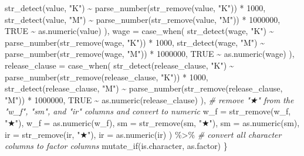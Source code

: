 \documentclass[
]{article}
\newenvironment{Shaded}{\begin{snugshade}}{\end{snugshade}}
\newcommand{\AttributeTok}[1]{\textcolor[rgb]{0.77,0.63,0.00}{#1}}
\newcommand{\CommentTok}[1]{\textcolor[rgb]{0.56,0.35,0.01}{\textit{#1}}}
\newcommand{\ConstantTok}[1]{\textcolor[rgb]{0.00,0.00,0.00}{#1}}
\newcommand{\DecValTok}[1]{\textcolor[rgb]{0.00,0.00,0.81}{#1}}
\newcommand{\FunctionTok}[1]{\textcolor[rgb]{0.00,0.00,0.00}{#1}}
\newcommand{\NormalTok}[1]{#1}
\newcommand{\SpecialCharTok}[1]{\textcolor[rgb]{0.00,0.00,0.00}{#1}}
\newcommand{\StringTok}[1]{\textcolor[rgb]{0.31,0.60,0.02}{#1}}
\begin{document}
\begin{Shaded}
\begin{Highlighting}[]
           \FunctionTok{str\_detect}\NormalTok{(value, }\StringTok{"K"}\NormalTok{) }\SpecialCharTok{\textasciitilde{}} \FunctionTok{parse\_number}\NormalTok{(}\FunctionTok{str\_remove}\NormalTok{(value, }\StringTok{"K"}\NormalTok{)) }\SpecialCharTok{*} \DecValTok{1000}\NormalTok{,}
           \FunctionTok{str\_detect}\NormalTok{(value, }\StringTok{"M"}\NormalTok{) }\SpecialCharTok{\textasciitilde{}} \FunctionTok{parse\_number}\NormalTok{(}\FunctionTok{str\_remove}\NormalTok{(value, }\StringTok{"M"}\NormalTok{)) }\SpecialCharTok{*} \DecValTok{1000000}\NormalTok{,}
           \ConstantTok{TRUE} \SpecialCharTok{\textasciitilde{}} \FunctionTok{as.numeric}\NormalTok{(value)}
\NormalTok{         ),}
         \AttributeTok{wage =} \FunctionTok{case\_when}\NormalTok{(}
           \FunctionTok{str\_detect}\NormalTok{(wage, }\StringTok{"K"}\NormalTok{) }\SpecialCharTok{\textasciitilde{}} \FunctionTok{parse\_number}\NormalTok{(}\FunctionTok{str\_remove}\NormalTok{(wage, }\StringTok{"K"}\NormalTok{)) }\SpecialCharTok{*} \DecValTok{1000}\NormalTok{,}
           \FunctionTok{str\_detect}\NormalTok{(wage, }\StringTok{"M"}\NormalTok{) }\SpecialCharTok{\textasciitilde{}} \FunctionTok{parse\_number}\NormalTok{(}\FunctionTok{str\_remove}\NormalTok{(wage, }\StringTok{"M"}\NormalTok{)) }\SpecialCharTok{*} \DecValTok{1000000}\NormalTok{,}
           \ConstantTok{TRUE} \SpecialCharTok{\textasciitilde{}} \FunctionTok{as.numeric}\NormalTok{(wage)}
\NormalTok{         ),}
         \AttributeTok{release\_clause =} \FunctionTok{case\_when}\NormalTok{(}
           \FunctionTok{str\_detect}\NormalTok{(release\_clause, }\StringTok{"K"}\NormalTok{) }\SpecialCharTok{\textasciitilde{}} \FunctionTok{parse\_number}\NormalTok{(}\FunctionTok{str\_remove}\NormalTok{(release\_clause, }\StringTok{"K"}\NormalTok{)) }\SpecialCharTok{*} \DecValTok{1000}\NormalTok{,}
           \FunctionTok{str\_detect}\NormalTok{(release\_clause, }\StringTok{"M"}\NormalTok{) }\SpecialCharTok{\textasciitilde{}} \FunctionTok{parse\_number}\NormalTok{(}\FunctionTok{str\_remove}\NormalTok{(release\_clause, }\StringTok{"M"}\NormalTok{)) }\SpecialCharTok{*} \DecValTok{1000000}\NormalTok{,}
           \ConstantTok{TRUE} \SpecialCharTok{\textasciitilde{}} \FunctionTok{as.numeric}\NormalTok{(release\_clause)}
\NormalTok{         ),}
         \CommentTok{\# remove "★" from the "w\_f", "sm", and "ir" columns and convert to numeric}
         \AttributeTok{w\_f =} \FunctionTok{str\_remove}\NormalTok{(w\_f, }\StringTok{"★"}\NormalTok{),}
         \AttributeTok{w\_f =} \FunctionTok{as.numeric}\NormalTok{(w\_f),}
         \AttributeTok{sm =} \FunctionTok{str\_remove}\NormalTok{(sm, }\StringTok{"★"}\NormalTok{),}
         \AttributeTok{sm =} \FunctionTok{as.numeric}\NormalTok{(sm),}
         \AttributeTok{ir =} \FunctionTok{str\_remove}\NormalTok{(ir, }\StringTok{"★"}\NormalTok{),}
         \AttributeTok{ir =} \FunctionTok{as.numeric}\NormalTok{(ir)}
\NormalTok{         ) }\SpecialCharTok{\%\textgreater{}\%} 
  \CommentTok{\# convert all character columns to factor columns}
  \FunctionTok{mutate\_if}\NormalTok{(is.character, as.factor)}
\NormalTok{\}}
\end{Highlighting}
\end{Shaded}
\end{document}
